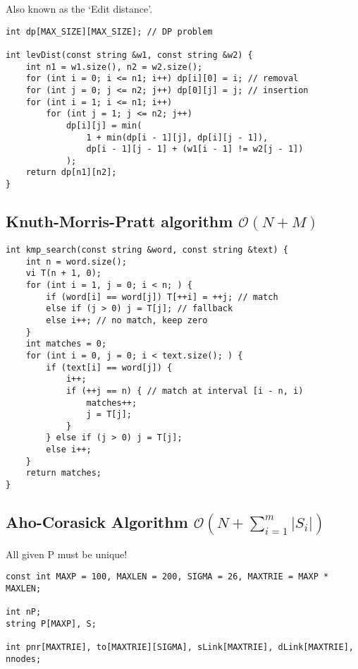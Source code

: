 \documentclass[8pt,a4paper,landscape,oneside]{amsart}
\begin{document}
\begin{multicols*}{3}
Also known as the `Edit distance'.

\begin{lstlisting}
int dp[MAX_SIZE][MAX_SIZE]; // DP problem

int levDist(const string &w1, const string &w2) {
	int n1 = w1.size(), n2 = w2.size();
	for (int i = 0; i <= n1; i++) dp[i][0] = i; // removal
	for (int j = 0; j <= n2; j++) dp[0][j] = j; // insertion
	for (int i = 1; i <= n1; i++)
		for (int j = 1; j <= n2; j++)
			dp[i][j] = min(
				1 + min(dp[i - 1][j], dp[i][j - 1]),
				dp[i - 1][j - 1] + (w1[i - 1] != w2[j - 1])
			);
	return dp[n1][n2];
}
\end{lstlisting}

\subsection{Knuth-Morris-Pratt algorithm $\mathcal{O}(N + M)$}

\begin{lstlisting}
int kmp_search(const string &word, const string &text) {
	int n = word.size();
	vi T(n + 1, 0);
	for (int i = 1, j = 0; i < n; ) {
		if (word[i] == word[j]) T[++i] = ++j; // match
		else if (j > 0) j = T[j]; // fallback
		else i++; // no match, keep zero
	}
	int matches = 0;
	for (int i = 0, j = 0; i < text.size(); ) {
		if (text[i] == word[j]) {
			i++;
			if (++j == n) { // match at interval [i - n, i)
				matches++;
				j = T[j];
			}
		} else if (j > 0) j = T[j];
		else i++;
	}
	return matches;
}
\end{lstlisting}

\subsection{Aho-Corasick Algorithm $\mathcal{O}(N + \sum_{i=1}^{m} |S_i|)$}

All given P must be unique!

\begin{lstlisting}
const int MAXP = 100, MAXLEN = 200, SIGMA = 26, MAXTRIE = MAXP * MAXLEN;

int nP;
string P[MAXP], S;

int pnr[MAXTRIE], to[MAXTRIE][SIGMA], sLink[MAXTRIE], dLink[MAXTRIE], nnodes;


\end{lstlisting}
\end{multicols*}
\end{document}
